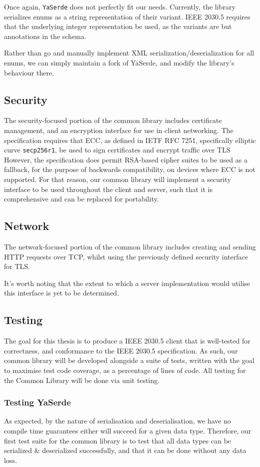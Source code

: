 Once again, \texttt{YaSerde} does not perfectly fit our needs. Currently, the library serializes enums as a string representation of their variant. IEEE 2030.5 requires that the underlying integer representation be used, as the variants are but annotations in the schema.

Rather than go and manually implement XML serialization/deserialization for all enums, we can simply maintain a fork of YaSerde, and modify the library's behaviour there.


\subsection{Security}
The security-focused portion of the common library includes certificate management, and an encryption interface for use in client networking.
The specification requires that ECC, as defined in IETF RFC 7251, specifically elliptic curve \texttt{secp256r1}, be used to sign certificates and encrypt traffic over TLS 
However, the specification does permit RSA-based cipher suites to be used as a fallback, for the purpose of backwards compatibility, on devices where ECC is not supported.
For that reason, our common library will implement a security interface to be used throughout the client and server, such that it is comprehensive and can be replaced for portability.

\subsection{Network}
The network-focused portion of the common library includes creating and sending HTTP requests over TCP, whilst using the previously defined security interface for TLS.

It's worth noting that the extent to which a server implementation would utilise this interface is yet to be determined.


\subsection{Testing}
The goal for this thesis is to produce a IEEE 2030.5 client that is well-tested for correctness, and conformance to the IEEE 2030.5 specification.
As such, our common library will be developed alongside a suite of tests, written with the goal to maximise test code coverage, as a percentage of lines of code.
All testing for the Common Library will be done via unit testing.

\subsubsection{Testing YaSerde}
As expected, by the nature of serialisation and deserialisation, we have no compile time guarantees either will succeed for a given data type.
Therefore, our first test suite for the common library is to test that all data types can be serialized \& deserialized successfully, and that it can be done without any data loss.

